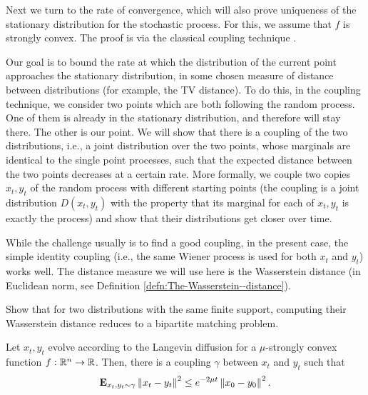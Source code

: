 Next we turn to the rate of convergence, which will also prove uniqueness
of the stationary distribution for the stochastic process. For this,
we assume that $f$ is strongly convex. The proof is via the classical
coupling technique \cite{aldous1995reversible}. 

Our goal is to bound the rate at which the distribution of the current
point approaches the stationary distribution, in some chosen measure
of distance between distributions (for example, the TV distance).
To do this, in the coupling technique, we consider two points which
are both following the random process. One of them is already in the
stationary distribution, and therefore will stay there. The other
is our point. We will show that there is a coupling of the two distributions,
i.e., a joint distribution over the two points, whose marginals are
identical to the single point processes, such that the expected distance
between the two points decreases at a certain rate. More formally,
we couple two copies $x_{t},y_{t}$ of the random process with different
starting points (the coupling is a joint distribution $D(x_{t},y_{t})$
with the property that its marginal for each of $x_{t},y_{t}$ is
exactly the process) and show that their distributions get closer
over time. 

While the challenge usually is to find a good coupling, in the present
case, the simple identity coupling (i.e., the same Wiener process
is used for both $x_{t}$ and $y_{t}$) works well. The distance measure
we will use here is the Wasserstein distance (in Euclidean norm, see
Definition \ref{defn:The-Wasserstein--distance}). 
\begin{xca}
Show that for two distributions with the same finite support, computing
their Wasserstein distance reduces to a bipartite matching problem. 
\end{xca}

\begin{lem}
Let $x_{t},y_{t}$ evolve according to the Langevin diffusion for
a $\mu$-strongly convex function $f:\mathbb{R}^{n}\rightarrow\mathbb{R}$. Then,
there is a coupling $\gamma$ between $x_{t}$ and $y_{t}$ such that
\[
\mathbf{E}_{x_{t},y_{t}\sim\gamma}\left\Vert x_{t}-y_{t}\right\Vert^{2}\le e^{-2\mu t}\left\Vert x_{0}-y_{0}\right\Vert^{2}.
\]
\end{lem}

